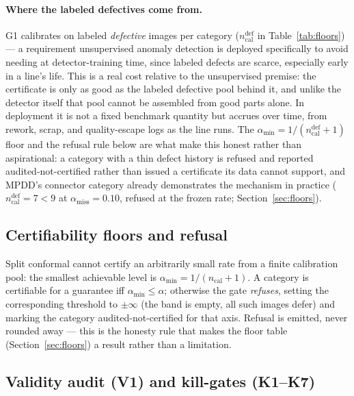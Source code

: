 \documentclass[11pt]{article}
\begin{document}
\paragraph{Where the labeled defectives come from.} G1 calibrates on labeled \emph{defective}
images per category ($n_{\text{cal}}^{\text{def}}$ in Table~\ref{tab:floors}) --- a requirement
unsupervised anomaly detection is deployed specifically to avoid needing at detector-training
time, since labeled defects are scarce, especially early in a line's life. This is a real cost
relative to the unsupervised premise: the certificate is only as good as the labeled defective
pool behind it, and unlike the detector itself that pool cannot be assembled from good parts
alone. In deployment it is not a fixed benchmark quantity but accrues over time, from rework,
scrap, and quality-escape logs as the line runs. The $\alpha_{\min}=1/(n_{\text{cal}}^{\text{def}}+1)$
floor and the refusal rule below are what make this honest rather than aspirational: a category
with a thin defect history is refused and reported audited-not-certified rather than issued a
certificate its data cannot support, and MPDD's connector category already demonstrates the
mechanism in practice ($n_{\text{cal}}^{\text{def}}=7 < 9$ at $\alpha_{\text{miss}}=0.10$, refused
at the frozen rate; Section~\ref{sec:floors}).

\subsection{Certifiability floors and refusal}
\label{sec:floor}

Split conformal cannot certify an arbitrarily small rate from a finite calibration pool: the
smallest achievable level is $\alpha_{\min} = 1/(n_{\text{cal}}+1)$. A category is certifiable for a
guarantee iff $\alpha_{\min} \le \alpha$; otherwise the gate \emph{refuses}, setting the
corresponding threshold to $\pm\infty$ (the band is empty, all such images defer) and marking the
category audited-not-certified for that axis. Refusal is emitted, never rounded away
--- this is the honesty rule that makes the floor table (Section~\ref{sec:floors}) a result rather
than a limitation.

\subsection{Validity audit (V1) and kill-gates (K1--K7)}
\label{sec:v1}
\end{document}
